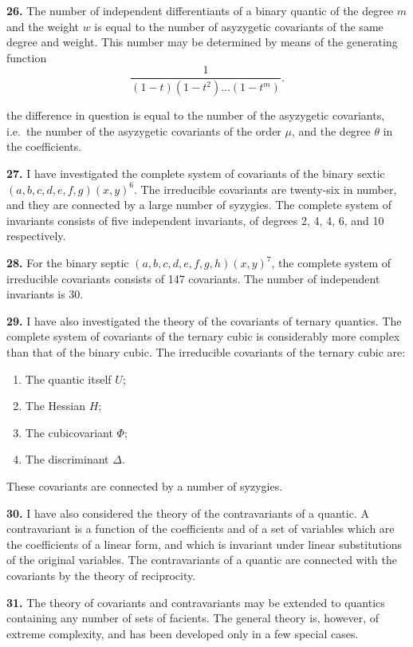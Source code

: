 \documentclass[12pt,a4paper]{article}
\begin{document}
\textbf{26.} The number of independent differentiants of a binary quantic of the degree $m$ and the weight $w$ is equal to the number of asyzygetic covariants of the same degree and weight. This number may be determined by means of the generating function
\[
\frac{1}{(1-t)(1-t^2)\ldots(1-t^m)}.
\]

\newpage
\setcounter{page}{257}

the difference in question is equal to the number of the asyzygetic covariants, i.e.\ the number of the asyzygetic covariants of the order $\mu$, and the degree $\theta$ in the coefficients.

\textbf{27.} I have investigated the complete system of covariants of the binary sextic $(a, b, c, d, e, f, g)(x, y)^6$. The irreducible covariants are twenty-six in number, and they are connected by a large number of syzygies. The complete system of invariants consists of five independent invariants, of degrees 2, 4, 4, 6, and 10 respectively.

\textbf{28.} For the binary septic $(a, b, c, d, e, f, g, h)(x, y)^7$, the complete system of irreducible covariants consists of 147 covariants. The number of independent invariants is 30.

\textbf{29.} I have also investigated the theory of the covariants of ternary quantics. The complete system of covariants of the ternary cubic is considerably more complex than that of the binary cubic. The irreducible covariants of the ternary cubic are:
\begin{enumerate}
\item The quantic itself $U$;
\item The Hessian $H$;
\item The cubicovariant $\Phi$;
\item The discriminant $\Delta$.
\end{enumerate}
These covariants are connected by a number of syzygies.

\newpage
\setcounter{page}{258}

\textbf{30.} I have also considered the theory of the contravariants of a quantic. A contravariant is a function of the coefficients and of a set of variables which are the coefficients of a linear form, and which is invariant under linear substitutions of the original variables. The contravariants of a quantic are connected with the covariants by the theory of reciprocity.

\textbf{31.} The theory of covariants and contravariants may be extended to quantics containing any number of sets of facients. The general theory is, however, of extreme complexity, and has been developed only in a few special cases.
\end{document}

